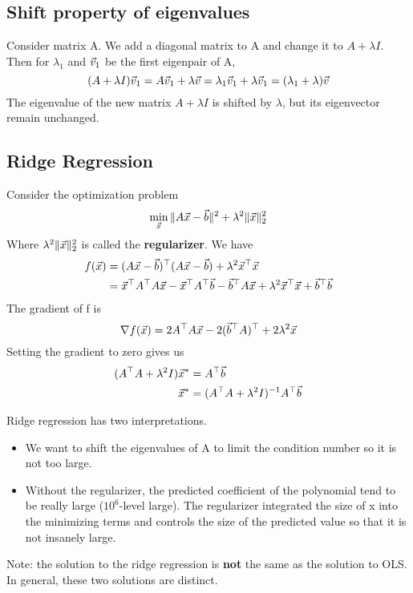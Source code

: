 
\subsection{Shift property of eigenvalues} %
\label{sub:shift_property_of_eigenvalues}

\begin{theorem}
	Consider matrix A. We add a diagonal matrix to A and change it to $A+\lambda I$. Then for $\lambda_1$ and $\vec{v}_1$ be the first eigenpair of A,
	\[
(A+\lambda I)\vec{v}_1 = A\vec{v}_1+\lambda\vec{v} = \lambda_1\vec{v}_1+\lambda\vec{v}_1=(\lambda_1+\lambda)\vec{v}
	\]
	The eigenvalue of the new matrix $A+\lambda I$ is shifted by $\lambda$, but its eigenvector remain unchanged.
\end{theorem}


\subsection{Ridge Regression} %
\label{sub:ridge_regression}

\begin{theorem}
	Consider the optimization problem
	\[
\min_{\vec{x}}\|A\vec{x}-\vec{b}\|^2+\lambda^2\|\vec{x}\|_2^2
	\]
	Where $\lambda^2\|\vec{x}\|_2^2$ is called the \textbf{regularizer}. We have
	\begin{align*}
		f(\vec{x}) &= (A\vec{x}-\vec{b})^\top(A\vec{x}-\vec{b})+\lambda^2\vec{x}^\top\vec{x}\\
		&= \vec{x}^\top A^\top A\vec{x}-\vec{x}^\top A^\top \vec{b}-\vec{b}^\top A\vec{x}+\lambda^2\vec{x}^\top\vec{x}+\vec{b}^\top\vec{b}
	\end{align*}
	The gradient of f is 
	\[
\nabla f(\vec{x}) = 2A^\top A\vec{x}-2(\vec{b}^\top A)^\top +2 \lambda^2\vec{x}
	\]
	Setting the gradient to zero gives us
	\begin{align*}
		(A^\top A+\lambda^2I)\vec{x}^* &= A^\top\vec{b}\\
\vec{x}^* &= (A^\top A+\lambda^2 I)^{-1}A^\top\vec{b}
	\end{align*} 

	Ridge regression has two interpretations.
	\begin{itemize}
		\item We want to shift the eigenvalues of A to limit the condition number so it is not too large.
		\item Without the regularizer, the predicted coefficient of the polynomial tend to be really large ($10^6$-level large). The regularizer integrated the size of x into the minimizing terms and controls the size of the predicted value so that it is not insanely large.
	\end{itemize}

	Note: the solution to the ridge regression is \textbf{not} the same as the solution to OLS. In general, these two solutions are distinct.
\end{theorem}

